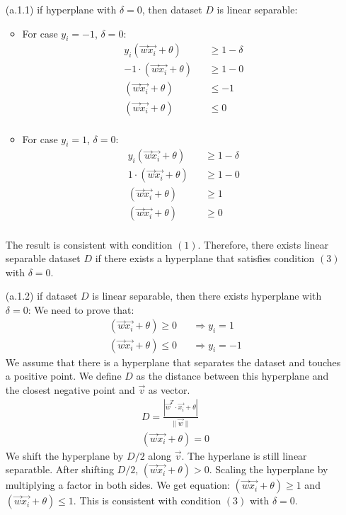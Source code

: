 \begin{enumerate}
\begin{enumerate}
\begin{enumerate}
			\begin{enumerate}
				\item[(a.1.1)] if hyperplane with $\delta=0$, then dataset $D$ is linear separable:
				\begin{itemize}
				\item For case $y_i = -1$, $\delta = 0$:
					\begin{eqnarray}
						y_i(\vec{w} \vec{x_i} + \theta) &&\geq 1 - \delta\\
						-1 \cdot (\vec{w} \vec{x_i} + \theta) &&\geq 1 - 0\\
						(\vec{w} \vec{x_i} + \theta) &&\leq -1\\
						(\vec{w} \vec{x_i} + \theta) &&\leq 0\\
					\end{eqnarray}
				\item For case $y_i = 1$, $\delta = 0$:
					\begin{eqnarray}
						y_i(\vec{w} \vec{x_i} + \theta) &&\geq 1 - \delta\\
						1 \cdot (\vec{w} \vec{x_i} + \theta) &&\geq 1 - 0\\
						(\vec{w} \vec{x_i} + \theta) &&\geq 1\\
						(\vec{w} \vec{x_i} + \theta) &&\geq 0\\
					\end{eqnarray}
				\end{itemize}
				The result is consistent with condition $(1)$. Therefore, there exists linear separable dataset $D$ if there exists a hyperplane that satisfies condition $(3)$ with $\delta = 0$.
				\item[(a.1.2)] if dataset $D$ is linear separable, then there exists hyperplane with $\delta = 0$:
				We need to prove that:
				\begin{eqnarray}
					(\vec{w} \vec{x_i} + \theta) \geq 0 &&\Rightarrow y_i = 1\\
					(\vec{w} \vec{x_i} + \theta) \leq 0 &&\Rightarrow y_i = -1 
				\end{eqnarray}
				We assume that there is a hyperplane that separates the dataset and touches a positive point. We define $D$ as the distance between this hyperplane and the closest negative point and $\vec{v}$ as vector. 
				\begin{eqnarray}
					D = \frac{|\vec{w}^T\cdot\vec{x_i} + \theta|}{\lVert\vec{w}\rVert}\\
					(\vec{w} \vec{x_i} + \theta) = 0
				\end{eqnarray}
				We shift the hyperplane by $D/2$ along $\vec{v}$. The hyperlane is still linear separatble. After shifting $D/2$, $(\vec{w} \vec{x_i} + \theta) > 0$. Scaling the hyperplane by multiplying a factor in both sides. We get equation: $(\vec{w} \vec{x_i} + \theta) \geq 1$ and $(\vec{w} \vec{x_i} + \theta) \leq 1$. This is consistent with condition $(3)$ with $\delta = 0$.

\end{enumerate}
\end{enumerate}
\end{enumerate}
\end{enumerate}
